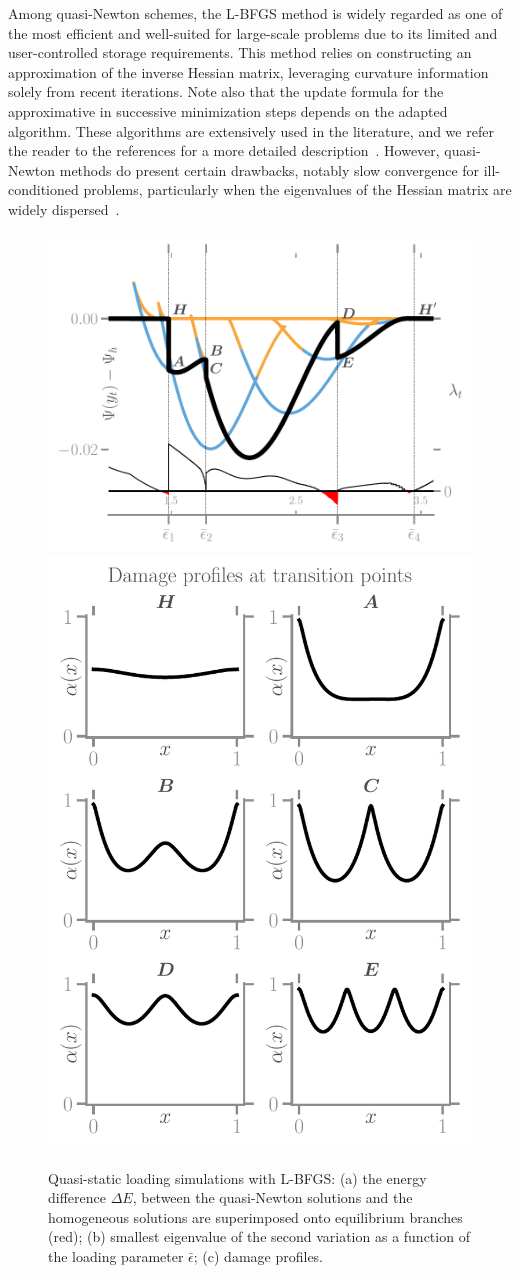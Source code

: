 Among quasi-Newton schemes, the L-BFGS method is widely regarded as one of the most efficient and well-suited for large-scale problems due to its limited and user-controlled storage requirements. This method relies on constructing an approximation of the inverse Hessian matrix, leveraging curvature information solely from recent iterations. Note also that the update formula for the approximative in successive minimization steps depends on the adapted algorithm. These algorithms are extensively used in the literature, and we refer the reader to the references for a more detailed description~\cite{Matthies1979-gl,Xu2001-ax,Nocedal1999-zr,Nocedal2006-qh,Simone2012-tx,Lewis2013-eu,Curtis2015-wp}. However, quasi-Newton methods do present certain drawbacks, notably slow convergence for ill-conditioned problems, particularly when the eigenvalues of the Hessian matrix are widely dispersed~\cite{Simone2012-tx}.
\begin{figure}
    \includegraphics[width=.7\textwidth]{../images/model_compliant_energy_kick.pdf}
    \includegraphics[width=.4\textwidth]{../images/model_compliant_profiles.pdf}
    \caption{
        Quasi-static loading simulations with L-BFGS: (a) the energy difference $\Delta E$, between the quasi-Newton solutions and the homogeneous solutions are superimposed onto equilibrium branches (red); (b) smallest eigenvalue of the second variation  as a function of the loading parameter $\bar\epsilon$; (c) damage profiles.}
    \label{fig:tempo2}
\end{figure}


